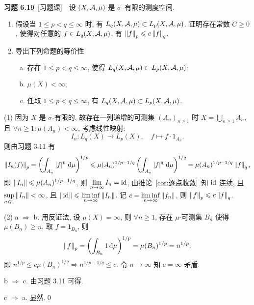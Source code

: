     \textbf{习题 6.19}\ [习题课]\ \ 设 $ (X, \mathcal{A}, \mu) $ 是 $ \sigma $--有限的测度空间.
    \begin{enumerate}[(1)]
        \item 假设当 $ 1\leqslant p<q\leqslant\infty $ 时, 有 $ L_{q}(X, \mathcal{A}, \mu)\subset L_{p}(X, \mathcal{A}, \mu) $. 证明存在常数 $ C\geqslant0 $, 使得对任意的 $ f\in L_{q}(X, \mathcal{A}, \mu) $, 有 $ \left\| f \right\|_{p}\leqslant c\left\| f \right\|_{q} $.
        \item 导出下列命题的等价性
        \begin{enumerate}[a. ]
            \item 存在 $ 1\leqslant p<q\leqslant\infty $, 使得 $ L_{q}(X, \mathcal{A}, \mu)\subset L_{p}(X, \mathcal{A}, \mu) $;
            \item $ \mu(X)<\infty $;
            \item 任取 $ 1\leqslant p<q\leqslant\infty $, 有 $ L_{q}(X, \mathcal{A}, \mu)\subset L_{p}(X, \mathcal{A}, \mu) $.
        \end{enumerate}
    \end{enumerate}
    \begin{Proof}
        (1) 因为 $ X $ 是 $ \sigma $-有限的, 故存在一列递增的可测集 $ (A_{n})_{n\geqslant1} $ 时 $ X=\bigcup_{n\geqslant1}A_{n} $, 且 $ \forall n\geqslant1:\mu(A_{n})<\infty $, 考虑线性映射:
        \[
            I_{n}: L_{q}(X)\to L_{p}(X), \quad f\mapsto f\cdot 1_{A_{n}}.
        \]
        则由习题 3.11 有
        \[
            \left\| I_{n}(f) \right\|_{p}=\left( \int_{A_{n}}\left| f \right| ^{p}\,\mathrm{d}\mu \right)^{1/p}\leqslant \mu(A_{n})^{1/p-1/q}\left( \int_{A_{n}}\left| f \right| ^{q}\,\mathrm{d}\mu \right)^{1/q}=\mu(A_{n})^{1/p-1/q}\left\| f \right\|_{q},
        \]
        即 $ \left\| I_{n} \right\|\leqslant\mu(A_{n})^{1/p-1/q} $, 则 $ \lim\limits_{n\to\infty}I_{n}=\mathrm{id} $, 由推论~\ref{cor:逐点收敛}~知 $ \mathrm{id} $ 连续, 且 $ \sup\limits_{n\leqslant1}\left\| I_{n} \right\|<\infty $, 且 $ \left\| \mathrm{id} \right\|\leqslant\liminf\limits_{n\to\infty}\left\| I_{n} \right\| $. 记 $ c=\liminf\limits_{n\to\infty}\left\| f_{n} \right\| $, 则 $ \left\| f \right\|_{p}\leqslant c\left\| f \right\|_{q} $.

        (2) a $ \Rightarrow $ b. 用反证法, 设 $ \mu(X)=\infty $, 则 $ \forall n\geqslant1 $, 存在 $ \mu $-可测集 $ B_{n} $ 使得 $ \mu(B_{n})\geqslant n $, 取 $ f = 1_{B_{n}} $, 则
        \[
            \left\| f \right\|_{p}=\left( \int_{B_{n}}1\,\mathrm{d}\mu \right)^{1/p}=\mu(B_{n})^{1/p}=n^{1/p}.
        \]
        即 $ n^{1/p}\leqslant c\mu(B_{n})^{1/q}\Longrightarrow n^{1/p-1/q}\leqslant c $. 令 $ n\to \infty $ 知 $ c=\infty $ 矛盾.

        b $ \Rightarrow $ c. 由习题 3.11 可得.

        c $ \Rightarrow $ a. 显然.\qed
    \end{Proof}

